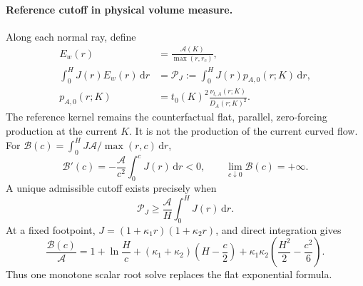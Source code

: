 \documentclass[11pt,a4paper]{article}
\numberwithin{equation}{section}
\begin{document}
\paragraph{Reference cutoff in physical volume measure.}
Along each normal ray, define
\begin{equation}
 \boxed{\begin{aligned}
 E_w(r)&=\frac{\mathcal A(K)}{\max(r,r_c)},\\
 \int_0^HJ(r)E_w(r)\,\mathrm dr
 &=\mathcal P_J:=\int_0^HJ(r)p_{A,0}(r;K)\,\mathrm dr,\\
 p_{A,0}(r;K)&=t_0(K)^2
                 \frac{\nu_{t,A}(r;K)}{D_A(r;K)^2}.
 \end{aligned}}
 \label{ba:curved-budget}
\end{equation}
The reference kernel remains the counterfactual flat, parallel,
zero-forcing production at the current $K$. It is not the production
of the current curved flow.
For $\mathcal B(c)=\int_0^HJ\mathcal A/\max(r,c)\,\mathrm dr$,
\begin{equation}
 \mathcal B'(c)=-\frac{\mathcal A}{c^2}\int_0^cJ(r)\,\mathrm dr<0,
 \qquad \lim_{c\downarrow0}\mathcal B(c)=+\infty.
 \label{ba:curved-monotonicity}
\end{equation}
A unique admissible cutoff exists precisely when
\begin{equation}
 \boxed{\mathcal P_J\geq
 \frac{\mathcal A}{H}\int_0^HJ(r)\,\mathrm dr.}
 \label{ba:curved-gate}
\end{equation}
At a fixed footpoint, $J=(1+\kappa_1r)(1+\kappa_2r)$, and direct
integration gives
\begin{equation}
 \frac{\mathcal B(c)}{\mathcal A}
 =1+\ln\frac Hc
 +(\kappa_1+\kappa_2)\left(H-\frac c2\right)
 +\kappa_1\kappa_2\left(\frac{H^2}{2}-\frac{c^2}{6}\right).
 \label{ba:curved-budget-explicit}
\end{equation}
Thus one monotone scalar root solve replaces the flat exponential formula.
\end{document}
